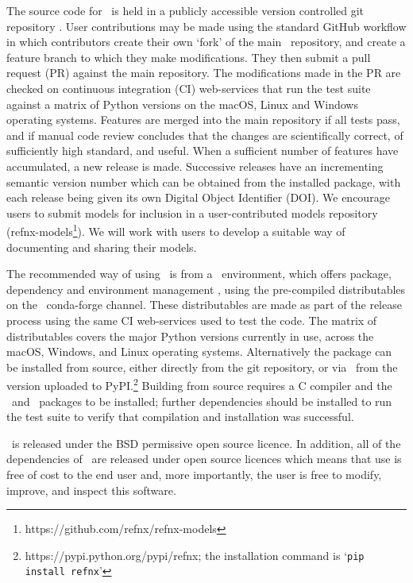 \documentclass[pdf,preprint]{iucr}
\begin{document}
The source code for \ is held in a publicly accessible version controlled git repository \cite{refnx}. User contributions may be made using the standard GitHub workflow in which contributors create their own `fork' of the main \ repository, and create a feature branch to which they make modifications.
They then submit a pull request (PR) against the main repository. The modifications made in the PR are checked on continuous integration (CI) web-services that run the test suite against a matrix of Python versions on the macOS, Linux and Windows operating systems. Features are merged into the main repository if all tests pass, and if manual code review concludes that the changes are scientifically correct, of sufficiently high standard, and useful. When a sufficient number of features have accumulated, a new release is made. Successive releases have an incrementing semantic version number which can be obtained from the installed package, with each release being given its own Digital Object Identifier (DOI).
We encourage users to submit models for inclusion in a user-contributed models repository (refnx-models\footnote{https://github.com/refnx/refnx-models}). We will work with users to develop a suitable way of documenting and sharing their models.

The recommended way of using \ is from a \conda\ environment, which offers package, dependency and environment management \cite{conda}, using the pre-compiled distributables on the \ conda-forge channel. These distributables are made as part of the release process using the same CI web-services used to test the code. The matrix of distributables covers the major Python versions currently in use, across the macOS, Windows, and Linux operating systems. Alternatively the package can be installed from source, either directly from the git repository, or via \pip\ from the version uploaded to PyPI.\footnote{https://pypi.python.org/pypi/refnx; the installation command is `\texttt{pip install refnx}'} Building from source requires a C compiler and the \Cython\ and \NumPy\ packages to be installed; further dependencies should be installed to run the test suite to verify that compilation and installation was successful.

\ is released under the BSD permissive open source licence. In addition, all of the  dependencies of \ are released under open source licences which means that use is free of cost to the end user and, more importantly, the user is free to modify, improve, and inspect this software.
\end{document}
